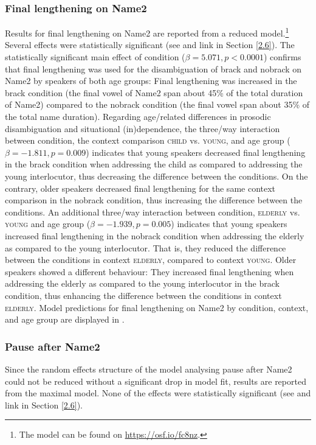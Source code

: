 \documentclass[output=paper]{langscibook}
\begin{document}
\subsubsection{Final lengthening on Name2}
Results for final lengthening on Name2 are reported from a reduced model.\footnote{The model can be found on \href{https://osf.io/fc8nz/?view_only=1974f7d0721049e2be0401c973234518}{https://osf.io/fc8nz}.} Several effects  were statistically significant (see  and link in Section \ref{2.6}). The statistically significant main effect of condition ($\beta = 5.071,\allowbreak p<0.0001$) confirms that final lengthening was used for the disambiguation of brack and nobrack on Name2 by speakers of both age groups: Final lengthening was increased in the brack condition (the final vowel of Name2 span about 45\% of the total duration of Name2) compared to the nobrack condition (the final vowel span about 35\% of the total name duration). Regarding age\-/related differences in prosodic disambiguation and situational (in)de\-pen\-dence, the three\-/way interaction between condition, the context comparison \textsc{child} vs. \textsc{young}, and age group ($\beta = -1.811,\allowbreak p = 0.009$) indicates that young speakers decreased final lengthening in the brack condition when addressing the child as compared to addressing the young interlocutor, thus decreasing the difference between the conditions. On the contrary, older speakers decreased final lengthening for the same context comparison in the nobrack condition, thus increasing the difference between the conditions. An additional three\-/way interaction between condition, \textsc{elderly} vs. \textsc{young} and age group ($\beta = -1.939,\allowbreak p = 0.005$) indicates that young speakers increased final lengthening in the nobrack condition when addressing the elderly as compared to the young interlocutor. That is, they reduced the difference between the conditions in context \textsc{elderly}, compared to context \textsc{young}. Older speakers showed a different behaviour: They increased final lengthening when addressing the elderly as compared to the young interlocutor in the brack condition, thus enhancing the difference between the conditions in context \textsc{elderly}. Model predictions for final lengthening on Name2 by condition, context, and age group are displayed in . 

\subsubsection{Pause after Name2}
Since the random effects structure of the model analysing pause after Name2 could not be reduced without a significant drop in model fit, results are reported from the maximal model. None of the effects  were statistically significant (see  and link in Section \ref{2.6}).
\end{document}
